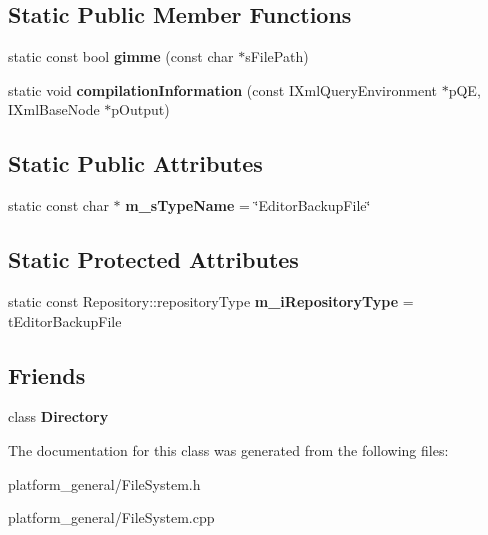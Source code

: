 \subsection*{\-Static \-Public \-Member \-Functions}
\begin{DoxyCompactItemize}
\item 
\hypertarget{classgeneral__server_1_1EditorBackupFile_aba75875da6f09f6e00275b8dcdda3d6f}{static const bool {\bfseries gimme} (const char $\ast$s\-File\-Path)}\label{classgeneral__server_1_1EditorBackupFile_aba75875da6f09f6e00275b8dcdda3d6f}

\item 
\hypertarget{classgeneral__server_1_1EditorBackupFile_a2c55fa756517a0956e10a89bc6528dee}{static void {\bfseries compilation\-Information} (const \-I\-Xml\-Query\-Environment $\ast$p\-Q\-E, \-I\-Xml\-Base\-Node $\ast$p\-Output)}\label{classgeneral__server_1_1EditorBackupFile_a2c55fa756517a0956e10a89bc6528dee}

\end{DoxyCompactItemize}
\subsection*{\-Static \-Public \-Attributes}
\begin{DoxyCompactItemize}
\item 
\hypertarget{classgeneral__server_1_1EditorBackupFile_ab6af26f6527229ad3fa6c7c125a7e706}{static const char $\ast$ {\bfseries m\-\_\-s\-Type\-Name} = \char`\"{}\-Editor\-Backup\-File\char`\"{}}\label{classgeneral__server_1_1EditorBackupFile_ab6af26f6527229ad3fa6c7c125a7e706}

\end{DoxyCompactItemize}
\subsection*{\-Static \-Protected \-Attributes}
\begin{DoxyCompactItemize}
\item 
\hypertarget{classgeneral__server_1_1EditorBackupFile_aff86241ec631e72f4f715d9a514793a0}{static const \*
\-Repository\-::repository\-Type {\bfseries m\-\_\-i\-Repository\-Type} = t\-Editor\-Backup\-File}\label{classgeneral__server_1_1EditorBackupFile_aff86241ec631e72f4f715d9a514793a0}

\end{DoxyCompactItemize}
\subsection*{\-Friends}
\begin{DoxyCompactItemize}
\item 
\hypertarget{classgeneral__server_1_1EditorBackupFile_a245303e8660be5fb8eb2828a8c44b773}{class {\bfseries \-Directory}}\label{classgeneral__server_1_1EditorBackupFile_a245303e8660be5fb8eb2828a8c44b773}

\end{DoxyCompactItemize}


\-The documentation for this class was generated from the following files\-:\begin{DoxyCompactItemize}
\item 
platform\-\_\-general/\-File\-System.\-h\item 
platform\-\_\-general/\-File\-System.\-cpp\end{DoxyCompactItemize}

